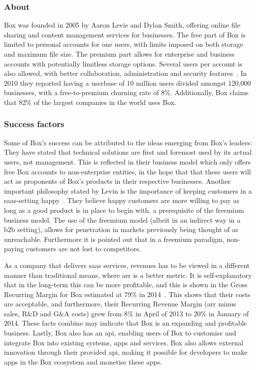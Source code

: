\subsubsection{About}
Box was founded in 2005 by Aaron Levie and Dylan Smith, offering online file sharing and content management services for businesses. The free part of Box is limited to personal accounts for one users, with limits imposed on both storage and maximum file size. The premium part allows for enterprise and business accounts with potentially limitless storage options. Several users per account is also allowed, with better collaboration, administration and security features~\cite{freemium.orgN/A}. In 2010 they reported having a userbase of 10 million users divided amongst 120,000 businesses, with a free-to-premium churning rate of 8\%. Additionally, Box claims that 82\% of the largest companies in the world uses Box.
\subsubsection{Success factors}
Some of Box's success can be attributed to the ideas emerging from Box's leaders: They have stated that technical solutions are first and foremost used by its actual users, not management. This is reflected in their business model which only offers free Box accounts to non-enterprise entities, in the hope that that these users will act as proponents of Box's products in their respective businesses. Another important philosophy stated by Levin is the importance of keeping customers in a \gls{saas}-setting happy~\cite{tientzuozuora2014}\cite{youtube2011}. They believe happy customers are more willing to pay as long as a good product is in place to begin with, a prerequisite of the freemium business model. The use of the freemium model (albeit in an indirect way in a \gls{b2b} setting), allows for penetration in markets previously being thought of as unreachable. Furthermore it is pointed out that in a freemium paradigm, non-paying customers are not lost to competitors.


As a company that delivers \gls{saas} services, revenues has to be viewed in a different manner than traditional means, where \gls{arr} is a better metric. It is self-explanatory that in the long-term this can be more profitable, and this is shown in the Gross Recurring Margin for Box estimated at 79\% in 2014~\cite{tientzuozuora2014}. This shows that their costs are acceptable, and furthermore, their Recurring Revenue Margin (\gls{arr} minus sales, R\&D and G\&A costs) grew from 8\% in April of 2013 to 20\% in January of 2014. These facts combine may indicate that Box is an expanding and profitable business. Lastly, Box also has an \gls{api}, enabling users of Box to customise and integrate Box into existing systems, apps and services. Box also allows external innovation through their provided \gls{api}, making it possible for developers to make apps in the Box ecosystem and monetise these apps. 

